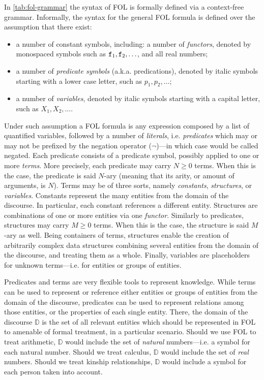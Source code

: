 \documentclass[12pt,a4paper,openright,twoside]{book}
\begin{document}
In \cref{tab:fol-grammar} the syntax of FOL is formally defined via a context-free grammar.
%
Informally, the syntax for the general FOL formula is defined over the assumption that there exist:
%
\begin{itemize}
    \item a number of constant symbols, including: a number of \emph{functors}, denoted by monospaced symbols such as $\mathtt{f}_1, \mathtt{f}_2, \ldots$, and all real numbers;

    \item a number of \emph{predicate symbols} (a.k.a. predications), denoted by italic symbols starting with a lower case letter, such as $p_1, p_2, \ldots$;

    \item a number of \emph{variables}, denoted by italic symbols starting with a capital letter, such as $X_1, X_2, \ldots$.
\end{itemize}
%
Under such assumption a FOL formula is any expression composed by a list of quantified variables, followed by a number of \emph{literals}, i.e. \emph{predicates} which may or may not be prefixed by the negation operator ($\lnot$)---in which case would be called negated.
%
Each predicate consists of a predicate symbol, possibly applied to one or more \emph{terms}.
%
More precisely, each predicate may carry $N \geq 0$ terms.
%
When this is the case, the predicate is said $N$-ary (meaning that its arity, or amount of arguments, is $N$).
%
Terms may be of three sorts, namely \emph{constants}, \emph{structures}, or \emph{variables}.
%
Constants represent the many entities from the domain of the discourse.
%
In particular, each constant references a different entity.
%
Structures are combinations of one or more entities via one \emph{functor}.
%
Similarly to predicates, structures may carry $M \geq 0$ terms.
%
When this is the case, the structure is said $M$-ary as well.
%
Being containers of terms, structures enable the creation of arbitrarily complex data structures combining several entities from the domain of the discourse, and treating them as a whole.
%
Finally, variables are placeholders for unknown terms---i.e. for entities or groups of entities.

Predicates and terms are very flexible tools to represent knowledge.
%
While terms can be used to represent or reference either entities or groups of entities from the domain of the discourse, predicates can be used to represent relations among those entities, or the properties of each single entity.
%
There, the domain of the discourse $\mathbb{D}$ \cite{blackburn2008oxford} is the set of all relevant entities which should be represented in FOL to amenable of formal treatment, in a particular scenario.
%
Should we use FOL to treat arithmetic, $\mathbb{D}$ would include the set of \emph{natural} numbers---i.e. a symbol for each natural number.
%
Should we treat calculus, $\mathbb{D}$ would include the set of \emph{real} numbers.
%
Should we treat kinship relationships, $\mathbb{D}$ would include a symbol for each person taken into account.
\end{document}
